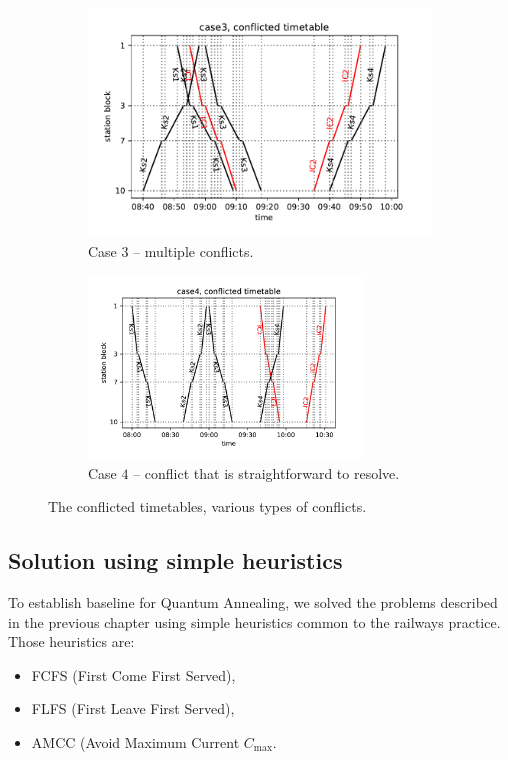 \begin{figure}
  \begin{subfigure}[b]{0.4\columnwidth}
    \includegraphics[width=0.8\linewidth]{figures/case3_conflict}
    \caption{Case $3$ -- multiple conflicts.}
    \label{fig::c3_conflict}
  \end{subfigure}
  \begin{subfigure}[b]{0.4\columnwidth}
    \includegraphics[width=0.8\textwidth]{figures/case4_conflict}
    \caption{Case $4$ -- conflict that is straightforward to resolve.}
    \label{fig::c4_conflict}
  \end{subfigure}
  \caption{The conflicted timetables, various types of conflicts.}
  \label{fig:conflictlarge}
\end{figure}


\subsection{Solution using simple heuristics}
To establish baseline for Quantum Annealing, we solved the problems described in the previous chapter
using simple heuristics common to the railways practice. Those heuristics are:

\begin{itemize}
  \item FCFS (First Come First Served),
  \item FLFS (First Leave First Served),
  \item AMCC (Avoid Maximum Current $C_{\max}$.
\end{itemize}

